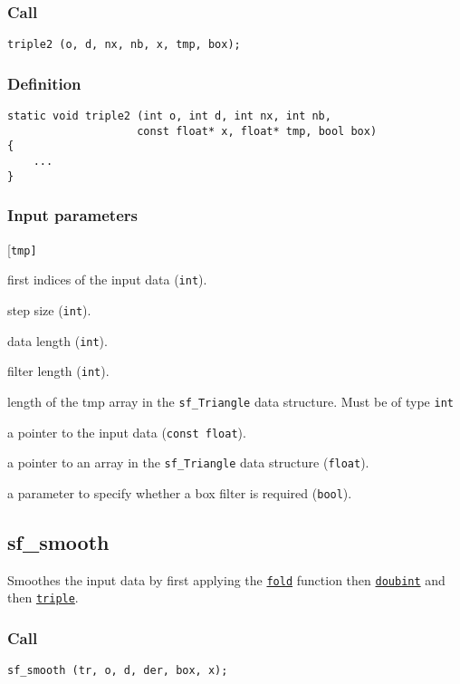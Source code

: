 \subsubsection*{Call}
\begin{verbatim}triple2 (o, d, nx, nb, x, tmp, box);\end{verbatim}

\subsubsection*{Definition}
\begin{verbatim}
static void triple2 (int o, int d, int nx, int nb, 
                    const float* x, float* tmp, bool box)
{
    ...
}
\end{verbatim}

\subsubsection*{Input parameters}
\begin{desclist}{\tt }{\quad}[\tt tmp]
   \setlength\itemsep{0pt}
   \item[o]   first indices of the input data (\texttt{int}).  
   \item[d]   step size (\texttt{int}).
   \item[nx]  data length (\texttt{int}).        
   \item[nb]  filter length (\texttt{int}).        
   \item[np]  length of the tmp array in the \texttt{sf\_Triangle} data structure. Must be of type \texttt{int}
   \item[x]   a pointer to the input data (\texttt{const float}). 
   \item[tmp] a pointer to an array in the \texttt{sf\_Triangle} data structure (\texttt{float}). 
   \item[box] a parameter to specify whether a box filter is required (\texttt{bool}).
\end{desclist}  




\subsection{{sf\_smooth}}
Smoothes the input data by first applying the \hyperref[sec:fold]{\texttt{fold}} function then \hyperref[sec:doubint]{\texttt{doubint}} and then \hyperref[sec:triple]{\texttt{triple}}.

\subsubsection*{Call}
\begin{verbatim}sf_smooth (tr, o, d, der, box, x);\end{verbatim}

